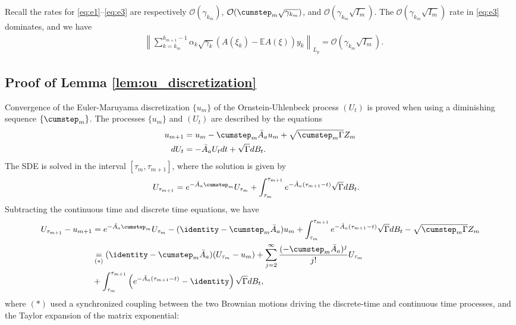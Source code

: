 \documentclass[11pt]{article}
\begin{document}
Recall the rates for \eqref{eq:e1}--\eqref{eq:e3} are respectively $\mathcal{O}(\gamma_{k_m} )$, $\mathcal{O}(\cumstep_m \sqrt{\gamma_{k_m}})$, and $\mathcal{O}(\gamma_{k_m}\sqrt{I_m} )$. 
The $\mathcal{O}(\gamma_{k_m}\sqrt{I_m} )$ rate in \eqref{eq:e3} dominates, and we have 
\begin{align*}
    &\left\lVert 
    \sum_{k=k_m}^{k_{m+1} - 1} \alpha_k \sqrt{\gamma_k} (A(\xi_k) - \mathbb{E}A(\xi)) y_k 
    \right\rVert_{L_p}
    = \mathcal{O}(\gamma_{k_m} \sqrt{I_m}) . 
\end{align*}

\subsection{Proof of Lemma \ref{lem:ou_discretization}}\label{app:ou_discretization}
Convergence of the Euler-Maruyama discretization $\{u_m\}$ of the Ornstein-Uhlenbeck process $(U_t)$ is proved when using a diminishing \stepsize sequence $\{\cumstep_m\}$. 
The processes $\{u_m\}$ and $(U_t)$ are described by the equations
\begin{align*}
    u_{m+1} &= u_m - \cumstep_m \bar{A}_a u_m + \sqrt{\cumstep_m \Gamma} Z_m 
    \\ 
    d U_t &= - \bar{A}_a U_t dt + \sqrt{\Gamma} dB_t . 
\end{align*}
The SDE is solved in the interval $[\tau_m, \tau_{m+1}]$, where the solution is given by
\begin{align*}
    U_{\tau_{m+1}} &= e^{-\bar{A}_a \cumstep_m} U_{\tau_m}
    +
    \int_{\tau_m}^{\tau_{m+1}} e^{-\bar{A}_a (\tau_{m+1} - t)} \sqrt{\Gamma} dB_t . 
\end{align*}
Subtracting the continuous time and discrete time equations, we have
\begin{align*}
    U_{\tau_{m+1}} - u_{m+1} 
    &= 
    e^{-\bar{A}_a \cumstep_m} U_{\tau_m} - (\identity - \cumstep_m \bar{A}_a)u_m 
    + 
    \int_{\tau_m}^{\tau_{m+1}} e^{-\bar{A}_a (\tau_{m+1} - t)} \sqrt{\Gamma} dB_t  - 
    \sqrt{\cumstep_m \Gamma} Z_m 
    \\ &
    \underset{(*)}{=} (\identity - \cumstep_m \bar{A}_a) (U_{\tau_m} - u_m)
    + 
    \sum_{j=2}^\infty \frac{(-\cumstep_m \bar{A}_a)^j}{j!} U_{\tau_m}
    \\ &
    +
    \int_{\tau_m}^{\tau_{m+1}} \left(e^{-\bar{A}_a (\tau_{m+1} - t)} - \identity \right)  \sqrt{\Gamma} dB_t
    ,
\end{align*}
where $(*)$ used a synchronized coupling between the two Brownian motions driving the discrete-time and continuous time processes, and the Taylor expansion of the matrix exponential:
\end{document}
